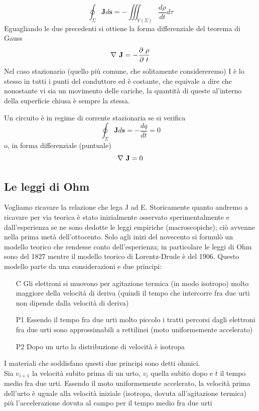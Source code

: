 \documentclass[
10pt, %
a4paper, %
oneside, %
headinclude,footinclude, %
BCOR5mm, %
]{scrartcl}
\begin{document}
\[\oint_\Sigma \mathbf{J}d\mathbf{s} = -\iiint_{V(\Sigma)}\frac{d\rho}{dt}d\tau\]
Eguagliando le due precedenti si ottiene la forma differenziale del teorema di Gauss
\[\mathbf{\nabla\ }\mathbf{J} = -\frac{\partial\ \rho}{\partial\  t}\]
Nel caso stazionario (quello più comune, che solitamente considereremo) I è lo stesso in tutti i punti del conduttore ed è costante, che equivale a dire che nonostante vi sia un movimento delle cariche, la quantità di queste al'interno della superficie chiusa è sempre la stessa. 
\begin{definizione}\label{def:corrente_stazionaria}
	Un circuito è in regime di corrente stazionaria se si verifica
	\[\oint_\Sigma \mathbf{J}d\mathbf{s} = -\frac{dq}{dt} = 0\]
	o, in forma differenziale (puntuale)
	\[\nabla\  \mathbf{J}=0\]
\end{definizione}
\subsection{Le leggi di Ohm}
Vogliamo ricavare la relazione che lega J ad E. Storicamente quanto andremo a ricavare per via teorica è stato inizialmente osservato sperimentalmente e dall'esperienza se ne sono dedotte le leggi empiriche (macroscopiche); ciò avvenne nella prima metà dell'ottocento. Solo agli inizi del novecento si formulò un modello teorico che rendesse conto dell'esperienza; in particolare le leggi di Ohm sono del 1827 mentre il modello teorico di Lorentz-Drude è del 1906. Questo modello parte da una considerazioni e due principi:
\begin{itemize}
	\item[C] Gli elettroni si muovono per agitazione termica (in modo isotropo) molto maggiore della velocità di deriva (quindi il tempo che intercorre fra due urti non dipende dalla velocità di deriva)
	\item[P1] Essendo il tempo fra due urti molto piccolo i tratti percorsi dagli elettroni fra due urti sono approssimabili a rettilinei (moto uniformemente accelerato)
	\item[P2] Dopo un urto la distribuzione di velocità è isotropa
\end{itemize}
I materiali che soddisfano questi due principi sono detti ohmici.\\
Sia \(v_{i+1}\) la velocità subito prima di un urto, \(v_i\) quella subito dopo e $\overline{t}$ il tempo medio fra due urti. Essendo il moto uniformemente accelerato, la velocità prima dell'urto è uguale alla velocità iniziale (isotropa, dovuta all'agitazione termica) più l'accelerazione dovuta al campo per il tempo medio fra due urti
\end{document}
